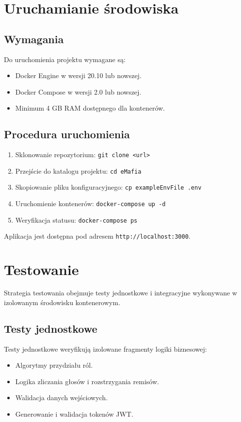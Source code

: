 ﻿\documentclass[a4paper,twoside,11pt]{mwrep}
\theoremstyle{plain} \newtheorem{thm}{Twierdzenie}
\theoremstyle{plain} \newtheorem{lem}{Lemat}
\theoremstyle{definition} \newtheorem{defn}{Definicja}
\theoremstyle{remark} \newtheorem*{rem}{Wniosek}
\begin{document}
\section{Uruchamianie środowiska}

\subsection{Wymagania}

Do uruchomienia projektu wymagane są:
\begin{itemize}
    \item Docker Engine w wersji 20.10 lub nowszej.
    \item Docker Compose w wersji 2.0 lub nowszej.
    \item Minimum 4 GB RAM dostępnego dla kontenerów.
\end{itemize}

\subsection{Procedura uruchomienia}

\begin{enumerate}
    \item Sklonowanie repozytorium: \texttt{git clone <url>}
    \item Przejście do katalogu projektu: \texttt{cd eMafia}
    \item Skopiowanie pliku konfiguracyjnego: \texttt{cp exampleEnvFile .env}
    \item Uruchomienie kontenerów: \texttt{docker-compose up -d}
    \item Weryfikacja statusu: \texttt{docker-compose ps}
\end{enumerate}

Aplikacja jest dostępna pod adresem \texttt{http://localhost:3000}.

\section{Testowanie}

Strategia testowania obejmuje testy jednostkowe i integracyjne wykonywane w izolowanym środowisku kontenerowym.

\subsection{Testy jednostkowe}

Testy jednostkowe weryfikują izolowane fragmenty logiki biznesowej:
\begin{itemize}
    \item Algorytmy przydziału ról.
    \item Logika zliczania głosów i rozstrzygania remisów.
    \item Walidacja danych wejściowych.
    \item Generowanie i walidacja tokenów JWT.
\end{itemize}
\end{document}
